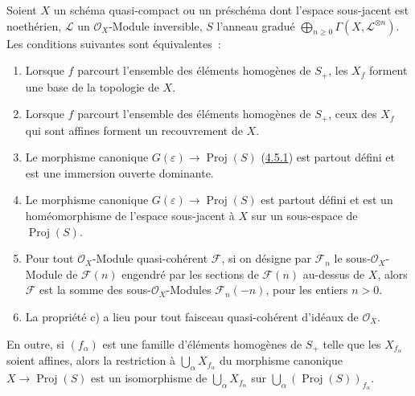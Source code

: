 \begin{theorem}[4.5.2]
\label{II.4.5.2-fr}
Soient $X$ un schéma quasi-compact ou un préschéma dont l'espace sous-jacent
est noethérien, $\mathcal{L}$ un $\mathcal{O}_X$-Module inversible, $S$
l'anneau gradué
$\bigoplus_{n\geq0}\Gamma(X,\mathcal{L}^{\otimes n})$. Les conditions
suivantes sont équivalentes~:
\begin{enumerate}
  \item[\rm{a)}] Lorsque $f$ parcourt l'ensemble des éléments homogènes de
  $S_+$, les $X_f$ forment une base de la topologie de $X$.
  \item[\rm{a')}] Lorsque $f$ parcourt l'ensemble des éléments homogènes de
  $S_+$, ceux des $X_f$ qui sont affines forment un recouvrement de $X$.
  \item[\rm{b)}] Le morphisme canonique
  $G(\varepsilon)\to\operatorname{Proj}(S)$
  \textup{(\hyperref[II.4.5.1-fr]{4.5.1})} est partout défini et est une immersion
  ouverte dominante.


  \item[\rm{b')}] Le morphisme canonique
  $G(\varepsilon)\to\operatorname{Proj}(S)$ est partout défini et est un
  homéomorphisme de l'espace sous-jacent à $X$ sur un sous-espace de
  $\operatorname{Proj}(S)$.
  \item[\rm{c)}] Pour tout $\mathcal{O}_X$-Module quasi-cohérent
  $\mathcal{F}$, si on désigne par $\mathcal{F}_n$ le
  sous-$\mathcal{O}_X$-Module de $\mathcal{F}(n)$ engendré par les sections de
  $\mathcal{F}(n)$ au-dessus de $X$, alors $\mathcal{F}$ est la somme des
  sous-$\mathcal{O}_X$-Modules $\mathcal{F}_n(-n)$, pour les entiers $n>0$.
  \item[\rm{c')}] La propriété \textup{c)} a lieu pour tout faisceau quasi-cohérent
  d'idéaux de $\mathcal{O}_X$.
\end{enumerate}

En outre, si $(f_\alpha)$ est une famille d'éléments homogènes de $S_+$
telle que les $X_{f_\alpha}$ soient affines, alors la restriction à
$\bigcup_\alpha X_{f_\alpha}$ du morphisme canonique
$X\to\operatorname{Proj}(S)$ est un isomorphisme de
$\bigcup_\alpha X_{f_\alpha}$ sur
$\bigcup_\alpha(\operatorname{Proj}(S))_{f_\alpha}$.
\end{theorem}

